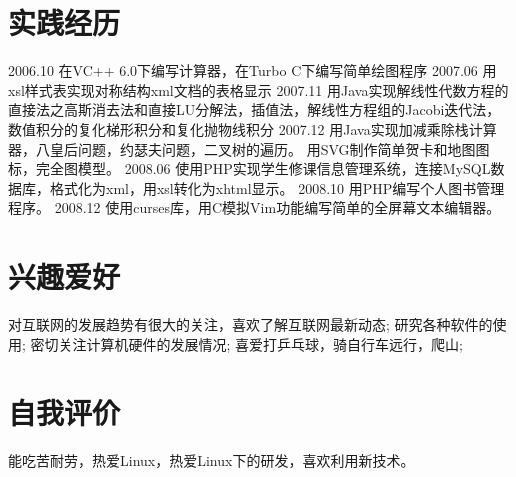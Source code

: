 \documentclass[a4paper]{moderncvwutao}
\begin{document}
\begin{CJK*}{UTF8}{gbsn}
\section{实践经历}
\cvitem
{
	2006.10
}
{
	在VC++ 6.0下编写计算器，在Turbo C下编写简单绘图程序
}
\cvitem
{
	2007.06
}
{
	用xsl样式表实现对称结构xml文档的表格显示
}
\cvitem
{
	2007.11
}
{
	用Java实现解线性代数方程的直接法之高斯消去法和直接LU分解法，插值法，解线性方程组的Jacobi迭代法，数值积分的复化梯形积分和复化抛物线积分
}
\cvitem
{
	2007.12
}
{
	用Java实现加减乘除栈计算器，八皇后问题，约瑟夫问题，二叉树的遍历。
		用SVG制作简单贺卡和地图图标，完全图模型。
}
\cvitem
{
	2008.06
}
{
使用PHP实现学生修课信息管理系统，连接MySQL数据库，格式化为xml，用xsl转化为xhtml显示。
}
\cvitem
{
	2008.10
}
{
		用PHP编写个人图书管理程序。
}
\cvitem
{
	2008.12
}
{
	使用curses库，用C模拟Vim功能编写简单的全屏幕文本编辑器。
}
\section{兴趣爱好}
\cvitem{}
{
	\small 对互联网的发展趋势有很大的关注，喜欢了解互联网最新动态;
	研究各种软件的使用;
	密切关注计算机硬件的发展情况;
	喜爱打乒乓球，骑自行车远行，爬山;
}
\section{自我评价}
\cvitem{}{}
{
	能吃苦耐劳，热爱Linux，热爱Linux下的研发，喜欢利用新技术。
}
\closesection
\end{CJK*}
\end{document}
